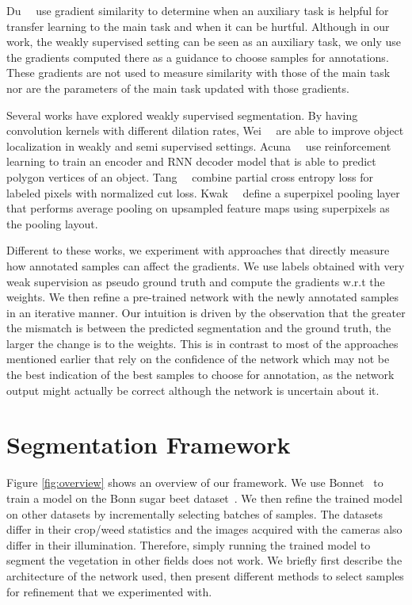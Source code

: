 Du~\etal~\cite{du2018adapting} use gradient similarity to determine when an auxiliary task is helpful for transfer learning to the main task and when it can be hurtful. Although in our work, the weakly supervised setting can be seen as an auxiliary task, we only use the gradients computed there as a guidance to choose samples for annotations. These gradients are not used to measure similarity with those of the main task nor are the parameters of the main task updated with those gradients.  

Several works have explored weakly supervised segmentation. By having convolution kernels with different dilation rates, Wei~\etal~\cite{wei2018revisiting} are able to improve object localization in weakly and semi supervised settings. Acuna~\etal~\cite{acuna2018efficient} use reinforcement learning to train an encoder and RNN decoder model that is able to predict polygon vertices of an object. Tang~\etal~\cite{tang2018normalized} combine partial cross entropy loss for labeled pixels with normalized cut loss. Kwak~\etal~\cite{kwak2017weakly} define a superpixel pooling layer that performs average pooling on upsampled feature maps using superpixels as the pooling layout.

Different to these works, we experiment with approaches that directly measure how annotated samples can affect the gradients. We use labels obtained with very weak supervision as pseudo ground truth and compute the gradients w.r.t the weights. We then refine a pre-trained network with the newly annotated samples in an iterative manner. Our intuition is driven by the observation that the greater the mismatch is between the predicted segmentation and the ground truth, the larger the change is to the weights. This is in contrast to most of the approaches mentioned earlier that rely on the confidence of the network which may not be the best indication of the best samples to choose for annotation, as the network output might actually be correct although the network is uncertain about it.

\section{Segmentation Framework} \label{sec:seg_framework}


Figure \ref{fig:overview} shows an overview of our framework. We use Bonnet~\cite{milioto2018bonnet} to train a model on the Bonn sugar beet dataset~\cite{chebrolu2017agricultural}. We then refine the trained model on other datasets by incrementally selecting batches of samples. The datasets differ in their crop/weed statistics and the images acquired with the cameras also differ in their illumination. Therefore, simply running the trained model to segment the vegetation in other fields does not work. We briefly first describe the architecture of the network used, then present different methods to select samples for refinement that we experimented with.



